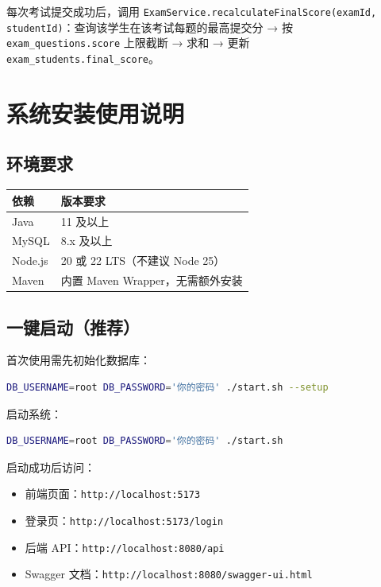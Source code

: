 \documentclass[12pt,a4paper]{ctexart}
\begin{document}
每次考试提交成功后，调用 \texttt{ExamService.recalculateFinalScore(examId, studentId)}：查询该学生在该考试每题的最高提交分 → 按 \texttt{exam\_questions.score} 上限截断 → 求和 → 更新 \texttt{exam\_students.final\_score}。

\section{系统安装使用说明}

\subsection{环境要求}

\begin{table}[h]
\centering
\begin{tabular}{ll}
\hline
依赖 & 版本要求 \\
\hline
Java  & 11 及以上 \\
MySQL & 8.x 及以上 \\
Node.js & 20 或 22 LTS（不建议 Node 25） \\
Maven  & 内置 Maven Wrapper，无需额外安装 \\
\hline
\end{tabular}
\end{table}

\subsection{一键启动（推荐）}

首次使用需先初始化数据库：

\begin{lstlisting}[language=bash]
DB_USERNAME=root DB_PASSWORD='你的密码' ./start.sh --setup
\end{lstlisting}

启动系统：

\begin{lstlisting}[language=bash]
DB_USERNAME=root DB_PASSWORD='你的密码' ./start.sh
\end{lstlisting}

启动成功后访问：

\begin{itemize}
  \item 前端页面：\texttt{http://localhost:5173}
  \item 登录页：\texttt{http://localhost:5173/login}
  \item 后端 API：\texttt{http://localhost:8080/api}
  \item Swagger 文档：\texttt{http://localhost:8080/swagger-ui.html}
\end{itemize}
\end{document}

